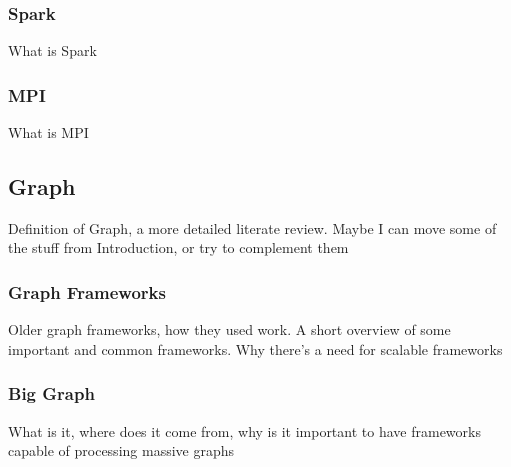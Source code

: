 \documentclass[english]{tktltiki}
\begin{document}
\subsubsection{Spark}
What is Spark
\subsubsection{MPI}
What is MPI

\subsection{Graph}
Definition of Graph, a more detailed literate review. Maybe I can move some of the stuff from Introduction, or try to complement them

\subsubsection{Graph Frameworks}
Older graph frameworks, how they used work. A short overview of some important and common frameworks. Why there's a need for scalable frameworks

\subsubsection{Big Graph}
What is it, where does it come from, why is it important to have frameworks capable of processing massive graphs
\end{document}
